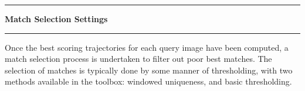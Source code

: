 \noindent\rule{\textwidth}{1pt}
\indent \textbf{Match Selection Settings}
\noindent\rule{\textwidth}{1pt}
\smallskip
\parbox{\textwidth}{Once the best scoring trajectories for each query image have been computed, a match selection process is undertaken to filter out poor best matches. The selection of matches is typically done by some manner of thresholding, with two methods available in the toolbox: windowed uniqueness, and basic thresholding.}
